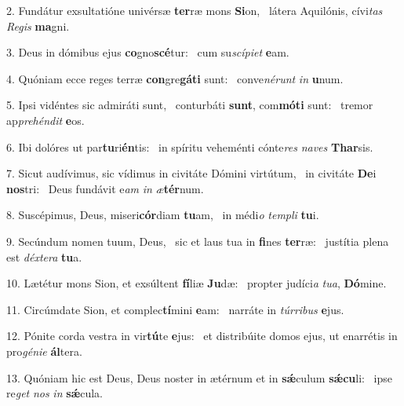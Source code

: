 2. Fundátur exsultatióne univérsæ \textbf{ter}ræ mons \textbf{Si}on, \ast\  látera Aquilónis, cívi\textit{tas} \textit{Re}\textit{gis} \textbf{ma}gni.\

3. Deus in dómibus ejus \textbf{co}gno\textbf{scé}tur: \ast\  cum su\textit{scí}\textit{pi}\textit{et} \textbf{e}am.\

4. Quóniam ecce reges terræ \textbf{con}gre\textbf{gá}\textbf{ti} sunt: \ast\  conve\textit{né}\textit{runt} \textit{in} \textbf{u}num.\

5. Ipsi vidéntes sic admiráti sunt, \dag\  conturbáti \textbf{sunt}, com\textbf{mó}\textbf{ti} sunt: \ast\  tremor ap\textit{pre}\textit{hén}\textit{dit} \textbf{e}os.\

6. Ibi dolóres ut par\textbf{tu}ri\textbf{én}tis: \ast\  in spíritu veheménti cónte\textit{res} \textit{na}\textit{ves} \textbf{Thar}sis.\

7. Sicut audívimus, sic vídimus in civitáte Dómini virtútum, \dag\  in civitáte \textbf{De}i \textbf{nos}tri: \ast\  Deus fundávit e\textit{am} \textit{in} \textit{æ}\textbf{tér}num.\

8. Suscépimus, Deus, miseri\textbf{cór}diam \textbf{tu}am, \ast\  in médi\textit{o} \textit{tem}\textit{pli} \textbf{tu}i.\

9. Secúndum nomen tuum, Deus, \dag\  sic et laus tua in \textbf{fi}nes \textbf{ter}ræ: \ast\  justítia plena est \textit{déx}\textit{te}\textit{ra} \textbf{tu}a.\

10. Lætétur mons Sion, et exsúltent \textbf{fí}liæ \textbf{Ju}dæ: \ast\  propter judíci\textit{a} \textit{tu}\textit{a}, \textbf{Dó}mine.\

11. Circúmdate Sion, et complec\textbf{tí}mini \textbf{e}am: \ast\  narráte in \textit{túr}\textit{ri}\textit{bus} \textbf{e}jus.\

12. Pónite corda vestra in vir\textbf{tú}te \textbf{e}jus: \ast\  et distribúite domos ejus, ut enarrétis in pro\textit{gé}\textit{ni}\textit{e} \textbf{ál}tera.\

13. Quóniam hic est Deus, Deus noster in ætérnum et in \textbf{sǽ}culum \textbf{sǽ}\textbf{cu}li: \ast\  ipse re\textit{get} \textit{nos} \textit{in} \textbf{sǽ}cula.\

